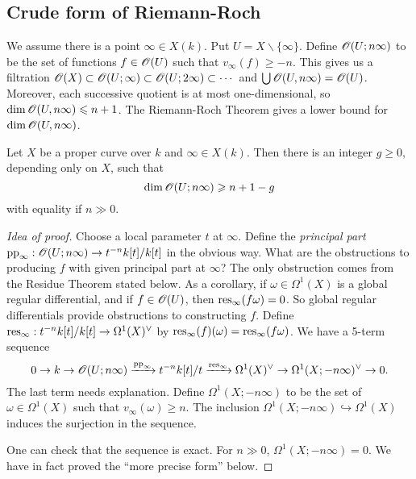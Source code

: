 \subsection{Crude form of Riemann-Roch}

We assume there is a point $\infty\in X(k)$. Put 
$U=X\smallsetminus \{\infty\}$. Define $\mathscr{O}(U;n\infty)$ to be the set of 
functions $f\in \mathscr{O}(U)$ such that $v_\infty(f)\geqslant -n$. This gives us a 
filtration $\mathscr{O}(X)\subset \mathscr{O}(U;\infty)\subset \mathscr{O}(U;2\infty)\subset \cdots$ 
and $\bigcup \mathscr{O}(U,n\infty) = \mathscr{O}(U)$. Moreover, 
each successive quotient is at most one-dimensional, so 
$\dim \mathscr{O}(U,n\infty) \leqslant n+1$. The Riemann-Roch Theorem gives a lower 
bound for $\dim \mathscr{O}(U,n\infty)$. 

\begin{theo}
Let $X$ be a proper curve over $k$ and $\infty\in X(k)$. Then there is an 
integer $g\geqslant 0$, depending only on $X$, such that 
\[
  \dim \mathscr{O}(U;n\infty) \geqslant n+1-g 
\]
with equality if $n\gg 0$. 
\end{theo}
\begin{proof}[Idea of proof]
Choose a local parameter $t$ at $\infty$. Define the \emph{principal part} 
$\operatorname{pp}_\infty:\mathscr{O}(U;n\infty) \to t^{-n} k[t] / k[t]$ in the obvious 
way. What are the obstructions to producing $f$ with given principal part at 
$\infty$? The only obstruction comes from the Residue Theorem stated below. As 
a corollary, if $\omega\in \Omega^1(X)$ is a global regular differential, and 
if $f\in \mathscr{O}(U)$, then $\operatorname{res}_\infty(f\omega) = 0$. So global regular 
differentials provide obstructions to constructing $f$. Define 
$\operatorname{res}_\infty:t^{-n} k[t]/k[t] \to \Omega^1(X)^\vee$ by 
$\operatorname{res}_\infty(f)(\omega) = \operatorname{res}_\infty(f\omega)$. We have a 5-term 
sequence 
\begin{equation*}
  0 \to k \to \mathscr{O}(U;n\infty) \xrightarrow{\operatorname{pp}_\infty} t^{-n} k[t]/t \xrightarrow{\operatorname{res}_\infty} \Omega^1(X)^\vee \to \Omega^1(X;-n\infty)^\vee \to 0.
\end{equation*}
The last term needs explanation. Define $\Omega^1(X;-n\infty)$ to be the set of 
$\omega\in \Omega^1(X)$ such that $v_\infty(\omega) \geqslant n$. The inclusion 
$\Omega^1(X;-n\infty)\hookrightarrow \Omega^1(X)$ induces the surjection in the 
sequence. 

One can check that the sequence is exact. For $n\gg 0$, 
$\Omega^1(X;-n\infty)=0$. We have in fact proved the ``more precise form'' 
below. 
\end{proof}

